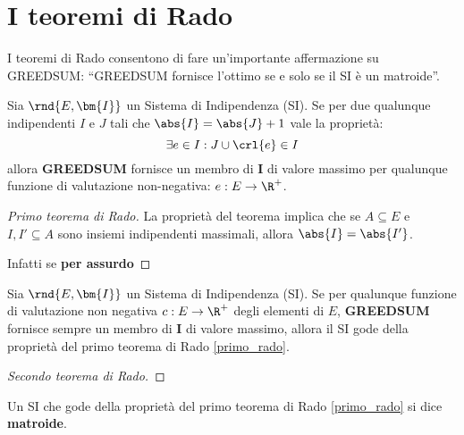 \documentclass[\main/main.tex]{subfiles}
\begin{document}
\section{I teoremi di Rado}
I teoremi di Rado consentono di fare un'importante affermazione su GREEDSUM: ``GREEDSUM fornisce l'ottimo se e solo se il SI è un matroide''.
\begin{theorem}
  Sia \(\rnd{E, \bm{I}}\) un Sistema di Indipendenza (SI). Se per due qualunque indipendenti \(I\) e \(J\) tali che \(\abs{I} = \abs{J} + 1\) vale la proprietà:
  \[
    \exists e \in I: J \cup \crl{e} \in I
  \]
  allora \textbf{GREEDSUM} fornisce un membro di \(\bm{I}\) di valore massimo per qualunque funzione di valutazione non-negativa: \(e: E \rightarrow \R^+\).
  \label{primo_rado}
\end{theorem}
\begin{proof}[Primo teorema di Rado]
  La proprietà del teorema implica che se \(A \subseteq E\) e \(I, I' \subseteq A\) sono insiemi indipendenti massimali, allora \(\abs{I} = \abs{I'}\).

  Infatti se \textbf{per assurdo}
\end{proof}
\begin{theorem}
  Sia \(\rnd{E, \bm{I}}\) un Sistema di Indipendenza (SI). Se per qualunque funzione di valutazione non negativa \(c: E \rightarrow \R^+\) degli elementi di \(E\), \textbf{GREEDSUM} fornisce sempre un membro di \(\bm{I}\) di valore massimo, allora il SI gode della proprietà del primo teorema di Rado \ref{primo_rado}.
\end{theorem}
\begin{proof}[Secondo teorema di Rado]
\end{proof}
\begin{definition}[Matroide]
  Un SI che gode della proprietà del primo teorema di Rado \ref{primo_rado} si dice \textbf{matroide}.
\end{definition}
\end{document}
